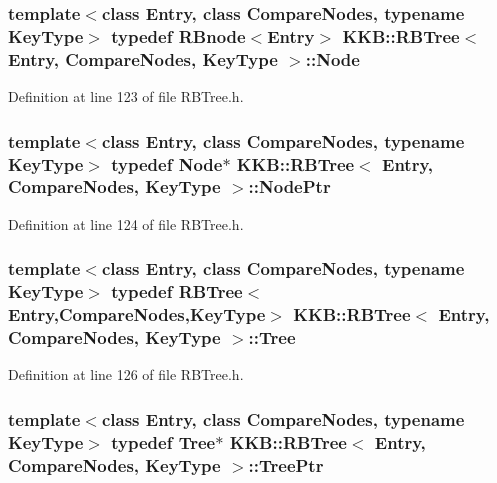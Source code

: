\subsubsection[{\texorpdfstring{Node}{Node}}]{\setlength{\rightskip}{0pt plus 5cm}template$<$class Entry, class Compare\+Nodes, typename Key\+Type$>$ typedef {\bf R\+Bnode}$<$Entry$>$ {\bf K\+K\+B\+::\+R\+B\+Tree}$<$ Entry, Compare\+Nodes, Key\+Type $>$\+::{\bf Node}}\hypertarget{class_k_k_b_1_1_r_b_tree_a06ef741f6d070fe4faebde70eec7ec6a}{}\label{class_k_k_b_1_1_r_b_tree_a06ef741f6d070fe4faebde70eec7ec6a}


Definition at line 123 of file R\+B\+Tree.\+h.

\subsubsection[{\texorpdfstring{Node\+Ptr}{NodePtr}}]{\setlength{\rightskip}{0pt plus 5cm}template$<$class Entry, class Compare\+Nodes, typename Key\+Type$>$ typedef {\bf Node}$\ast$ {\bf K\+K\+B\+::\+R\+B\+Tree}$<$ Entry, Compare\+Nodes, Key\+Type $>$\+::{\bf Node\+Ptr}}\hypertarget{class_k_k_b_1_1_r_b_tree_a6b0f3cc33c4554c51afe9bbb82c41906}{}\label{class_k_k_b_1_1_r_b_tree_a6b0f3cc33c4554c51afe9bbb82c41906}


Definition at line 124 of file R\+B\+Tree.\+h.

\subsubsection[{\texorpdfstring{Tree}{Tree}}]{\setlength{\rightskip}{0pt plus 5cm}template$<$class Entry, class Compare\+Nodes, typename Key\+Type$>$ typedef {\bf R\+B\+Tree}$<$Entry,Compare\+Nodes,Key\+Type$>$ {\bf K\+K\+B\+::\+R\+B\+Tree}$<$ Entry, Compare\+Nodes, Key\+Type $>$\+::{\bf Tree}}\hypertarget{class_k_k_b_1_1_r_b_tree_a4d849196b2997a6021ea34ef77901eb0}{}\label{class_k_k_b_1_1_r_b_tree_a4d849196b2997a6021ea34ef77901eb0}


Definition at line 126 of file R\+B\+Tree.\+h.

\subsubsection[{\texorpdfstring{Tree\+Ptr}{TreePtr}}]{\setlength{\rightskip}{0pt plus 5cm}template$<$class Entry, class Compare\+Nodes, typename Key\+Type$>$ typedef {\bf Tree}$\ast$ {\bf K\+K\+B\+::\+R\+B\+Tree}$<$ Entry, Compare\+Nodes, Key\+Type $>$\+::{\bf Tree\+Ptr}}\hypertarget{class_k_k_b_1_1_r_b_tree_a657196027b6c9741e01cb4563b7bf28b}{}\label{class_k_k_b_1_1_r_b_tree_a657196027b6c9741e01cb4563b7bf28b}


